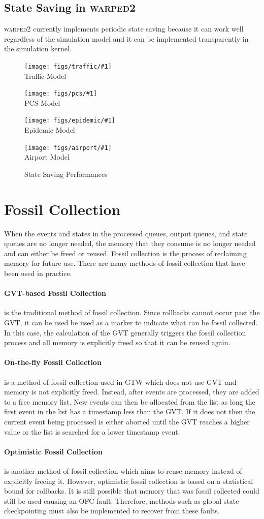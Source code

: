 \documentclass[11pt]{book}
\newcommand{\showPlots}[3]{
  \begin{figure}
    \begin{minipage}{.5\textwidth}
      \begin{center}
        \texttt{[image: figs/traffic/\#1]} \\
        Traffic Model \\
      \end{center}
    \end{minipage} \hfill
    \begin{minipage}{.5\textwidth}
      \begin{center}
        \texttt{[image: figs/pcs/\#1]} \\
        PCS Model \\
      \end{center}
    \end{minipage}
    \begin{minipage}{.5\textwidth}
      \begin{center}
        \texttt{[image: figs/epidemic/\#1]} \\
        Epidemic Model \\
      \end{center}
    \end{minipage} \hfill
    \begin{minipage}{.5\textwidth}
      \begin{center}
        \texttt{[image: figs/airport/\#1]} \\
        Airport Model \\
      \end{center}
    \end{minipage}
    \caption{#3}\label{#2}
  \end{figure}
}
\begin{document}
\subsection{State Saving in \textsc{warped2}}

\textsc{warped2} currently implements periodic state saving because it can work well
regardless of the simulation model and it can be implemented transparently in the simulation
kernel.

\showPlots{State Saving Performance.pdf}{ssp_performance}{State Saving Performances}

\section{Fossil Collection}

When the events and states in the processed queues, output queues, and state queues are
no longer needed, the memory that they consume is no longer needed and can either be freed
or reused. Fossil collection is the process of reclaiming memory for future use. There
are many methods of fossil collection that have been used in practice.

\paragraph{GVT-based Fossil Collection} is the traditional method of fossil collection.
Since rollbacks cannot occur past the GVT, it can be used be used as a marker to indicate
what can be fossil collected. In this case, the calculation of the GVT generally triggers
the fossil collection process and all memory is explicitly freed so that it can be reused
again.

\paragraph{On-the-fly Fossil Collection} is a method of fossil collection used in GTW
which does not use GVT and memory is not explicitly freed. Instead, after events are
processed, they are added to a free memory list. New events can then be allocated from the
list as long the first event in the list has a timestamp less than the GVT. If it does not
then the current event being processed is either aborted until the GVT reaches a higher
value or the list is searched for a lower timestamp event.

\paragraph{Optimistic Fossil Collection} is another method of fossil collection which
aims to reuse memory instead of explicitly freeing it. However, optimistic fossil collection
is based on a statistical bound for rollbacks. It is still possible that memory that was
fossil collected could still be used causing an OFC fault. Therefore, methods such as
global state checkpointing must also be implemented to recover from these faults.
\end{document}
